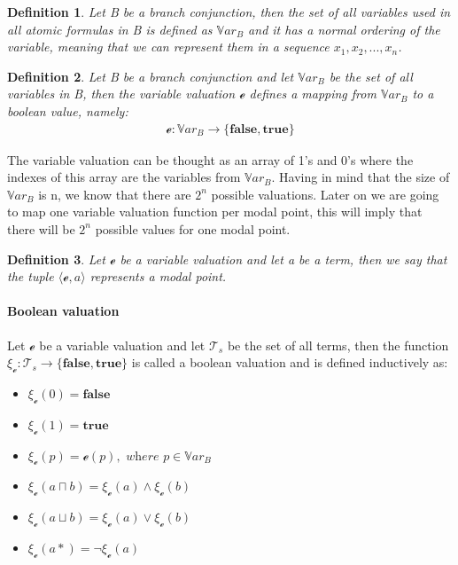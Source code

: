 \documentclass{article}
\newtheorem{defn}{Definition}[section]
\newcommand{\curvedE}{\mathscr{e}}
\newcommand{\Var}{\mathbb{V}ar}
\newcommand{\vBool}{\xi}
\newcommand{\Ts}{\mathcal{T}_s}
\begin{document}
	\begin{defn}
		Let B be a branch conjunction, then the set of all variables used in all atomic formulas in B is defined as $\Var_B$ and it has a normal ordering of the variable, meaning that we can represent them in a sequence $x_1, x_2, ..., x_n$.
	\end{defn}

	\begin{defn}
		Let B be a branch conjunction and let $\Var_B$ be the set of all variables in B, then the variable valuation $\curvedE$ defines a mapping from $\Var_B$ to a boolean value, namely:
		\begin{align*}
			\curvedE : \Var_B \rightarrow \{ \textbf{false}, \textbf{true}\}
		\end{align*}
	\end{defn}
	The variable valuation can be thought as an array of 1's and 0's where the indexes of this array are the variables from $\Var_B$. Having in mind that the size of $\Var_B$ is n, we know that there are $2^n$ possible valuations. Later on we are going to map one variable valuation function per modal point, this will imply that there will be $2^n$ possible values for one modal point.

	\begin{defn} 
		Let $\curvedE$ be a variable valuation and let a be a term, then we say that the tuple $\langle \curvedE, a \rangle$ represents a modal point.
	\end{defn}

	\paragraph{Boolean valuation}
		Let $\curvedE$ be a variable valuation and let $\Ts$ be the set of all terms,
		then the function $\vBool_{\curvedE} : \Ts \rightarrow \{ \textbf{false}, \textbf{true}\}$ is called a boolean valuation and is defined inductively as:
		\begin{itemize}
			\item $\vBool_{\curvedE}(0) = \textbf{false}$
			\item $\vBool_{\curvedE}(1) = \textbf{true}$
			\item $\vBool_{\curvedE}(p) = \curvedE(p), \textit{ where } p \in \Var_B$
			\item $\vBool_{\curvedE}(a \sqcap b) = \vBool_{\curvedE}(a) \land \vBool_{\curvedE}(b)$
			\item $\vBool_{\curvedE}(a \sqcup b) = \vBool_{\curvedE}(a) \lor \vBool_{\curvedE}(b)$
			\item $\vBool_{\curvedE}(a*) = \neg \vBool_{\curvedE}(a)$
		\end{itemize}
\end{document}
